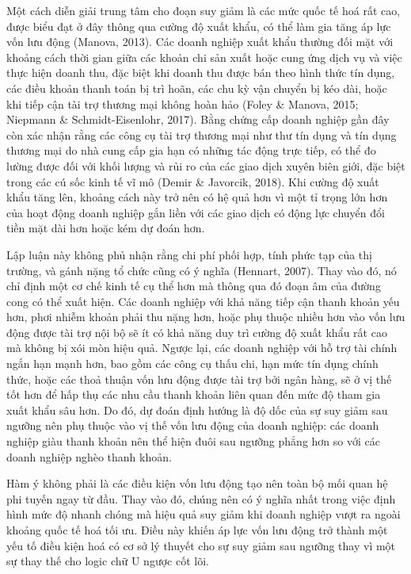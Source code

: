 \documentclass[12pt,a4paper]{article}
\begin{document}
Một cách diễn giải trung tâm cho đoạn suy giảm là các mức quốc tế hoá
rất cao, được biểu đạt ở đây thông qua cường độ xuất khẩu, có thể làm
gia tăng áp lực vốn lưu động (Manova, 2013). Các doanh nghiệp xuất khẩu
thường đối mặt với khoảng cách thời gian giữa các khoản chi sản xuất
hoặc cung ứng dịch vụ và việc thực hiện doanh thu, đặc biệt khi doanh
thu được bán theo hình thức tín dụng, các điều khoản thanh toán bị trì
hoãn, các chu kỳ vận chuyển bị kéo dài, hoặc khi tiếp cận tài trợ thương
mại không hoàn hảo (Foley \& Manova, 2015; Niepmann \&
Schmidt-Eisenlohr, 2017). Bằng chứng cấp doanh nghiệp gần đây còn xác
nhận rằng các công cụ tài trợ thương mại như thư tín dụng và tín dụng
thương mại do nhà cung cấp gia hạn có những tác động trực tiếp, có thể
đo lường được đối với khối lượng và rủi ro của các giao dịch xuyên biên
giới, đặc biệt trong các cú sốc kinh tế vĩ mô (Demir \& Javorcik, 2018).
Khi cường độ xuất khẩu tăng lên, khoảng cách này trở nên có hệ quả hơn
vì một tỉ trọng lớn hơn của hoạt động doanh nghiệp gắn liền với các giao
dịch có động lực chuyển đổi tiền mặt dài hơn hoặc kém dự đoán hơn.

Lập luận này không phủ nhận rằng chi phí phối hợp, tính phức tạp của thị
trường, và gánh nặng tổ chức cũng có ý nghĩa (Hennart, 2007). Thay vào
đó, nó chỉ định một cơ chế kinh tế cụ thể hơn mà thông qua đó đoạn âm
của đường cong có thể xuất hiện. Các doanh nghiệp với khả năng tiếp cận
thanh khoản yếu hơn, phơi nhiễm khoản phải thu nặng hơn, hoặc phụ thuộc
nhiều hơn vào vốn lưu động được tài trợ nội bộ sẽ ít có khả năng duy trì
cường độ xuất khẩu rất cao mà không bị xói mòn hiệu quả. Ngược lại, các
doanh nghiệp với hỗ trợ tài chính ngắn hạn mạnh hơn, bao gồm các công cụ
thấu chi, hạn mức tín dụng chính thức, hoặc các thoả thuận vốn lưu động
được tài trợ bởi ngân hàng, sẽ ở vị thế tốt hơn để hấp thụ các nhu cầu
thanh khoản liên quan đến mức độ tham gia xuất khẩu sâu hơn. Do đó, dự
đoán định hướng là độ dốc của sự suy giảm sau ngưỡng nên phụ thuộc vào
vị thế vốn lưu động của doanh nghiệp: các doanh nghiệp giàu thanh khoản
nên thể hiện đuôi sau ngưỡng phẳng hơn so với các doanh nghiệp nghèo
thanh khoản.

Hàm ý không phải là các điều kiện vốn lưu động tạo nên toàn bộ mối quan
hệ phi tuyến ngay từ đầu. Thay vào đó, chúng nên có ý nghĩa nhất trong
việc định hình mức độ nhanh chóng mà hiệu quả suy giảm khi doanh nghiệp
vượt ra ngoài khoảng quốc tế hoá tối ưu. Điều này khiến áp lực vốn lưu
động trở thành một yếu tố điều kiện hoá có cơ sở lý thuyết cho sự suy
giảm sau ngưỡng thay vì một sự thay thế cho logic chữ U ngược cốt lõi.
\end{document}
